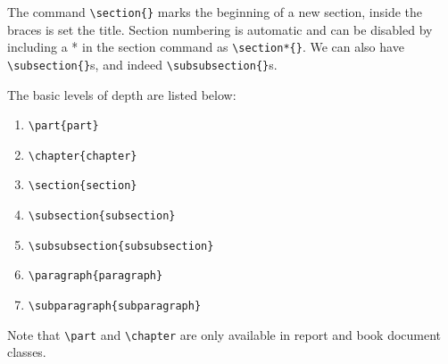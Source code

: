 \documentclass[12pt]{article}
\begin{document}
The command \verb+\section{}+ marks the beginning of a new section, inside the braces is set the title. Section numbering is automatic and can be disabled by including a * in the section command as \verb+\section*{}+. We can also have \verb+\subsection{}+s, and indeed \verb+\subsubsection{}+s. 


\begin{minipage}{\linewidth}
The basic levels of depth are listed below:

\begin{enumerate}
    \item \verb+\part{part}+
    \item \verb+\chapter{chapter}+
    \item \verb+\section{section}+
    \item \verb+\subsection{subsection}+
    \item \verb+\subsubsection{subsubsection}+
    \item \verb+\paragraph{paragraph}+
    \item \verb+\subparagraph{subparagraph}+
\end{enumerate}\bigskip

Note that \verb+\part+ and \verb+\chapter+ are only available in report and book document classes.
\end{minipage}
\end{document}
